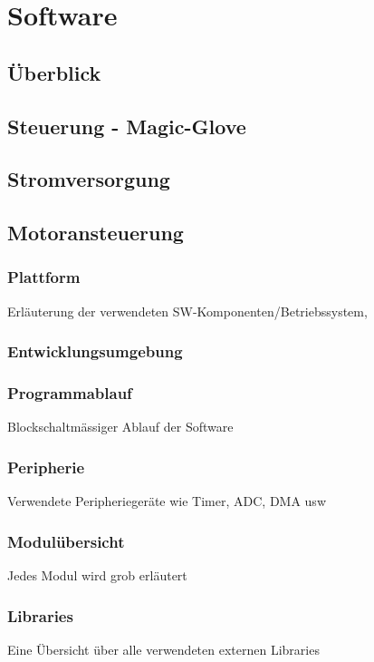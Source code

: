 \chapter{Software}
\label{Software}
\section{Überblick}
\section{Steuerung - Magic-Glove}
\label{SW_MagicGlove}
\section{Stromversorgung}
\label{SW_Stromversorgung}
\section{Motoransteuerung}
\label{SW_Motoransteuerung}
\subsection*{Plattform}
Erläuterung der verwendeten SW-Komponenten/Betriebssystem,
\subsection*{Entwicklungsumgebung}
\subsection*{Programmablauf}
Blockschaltmässiger Ablauf der Software
\subsection*{Peripherie}
Verwendete Peripheriegeräte wie Timer, ADC, DMA usw
\subsection*{Modulübersicht}
Jedes Modul wird grob erläutert
\subsection*{Libraries}
Eine Übersicht über alle verwendeten externen Libraries



